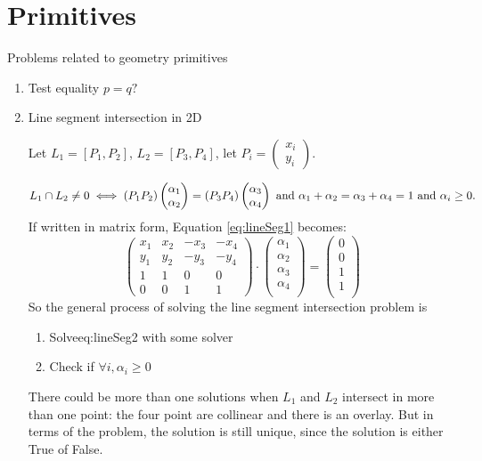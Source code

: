 \documentclass[12pt]{article}
\newcommand{\eref}[1]{Equation \ref{#1}}
\begin{document}
\section{Primitives}
Problems related to geometry primitives
\begin{enumerate}[1)]
\item Test equality $p = q?$
\item Line segment intersection in 2D

  Let $L_1 = [P_1, P_2]$, $L_2 = [P_3, P_4]$, let
  $P_i = \begin{pmatrix}x_i \\ y_i\end{pmatrix}$.

  \begin{equation}\label{eq:lineSeg1}
    L_1 \cap L_2 \neq 0 \iff (P_1 P_2)\begin{pmatrix}\alpha_1 \\
      \alpha_2\end{pmatrix} = (P_3 P_4)\begin{pmatrix}\alpha_3 \\
      \alpha_4\end{pmatrix}
    \\\text{ and } \alpha_1 + \alpha_2 = \alpha_3 + \alpha_4 = 1 \text{ and }
    \alpha_i \geq 0.
  \end{equation}
  If written in matrix form, \eref{eq:lineSeg1} becomes:
  \begin{equation}\label{eq:lineSeg2}
    \begin{pmatrix}
      x_1 & x_2 & -x_3 & -x_4 \\
      y_1 & y_2 & -y_3 & -y_4 \\
      1 & 1 & 0 & 0 \\
      0 & 0 & 1 & 1 
    \end{pmatrix}
    \cdot
    \begin{pmatrix}
      \alpha_1\\
      \alpha_2\\
      \alpha_3\\
      \alpha_4\\
    \end{pmatrix}
    = 
    \begin{pmatrix}
      0\\
      0\\
      1\\
      1\\
    \end{pmatrix}
    \end{equation}
    So the general process of solving the line segment intersection
    problem is
    \begin{enumerate}[{Step }I.]
    \item Solve{eq:lineSeg2} with some solver
    \item Check if $\forall i, \alpha_i \geq 0$
    \end{enumerate}
    There could be more than one solutions when $L_1$ and $L_2$
    intersect in more than one point: the four point are collinear and
    there is an overlay. But in terms of the problem, the solution is
    still unique, since the solution is either True of False.
    

\end{enumerate}
\end{document}
